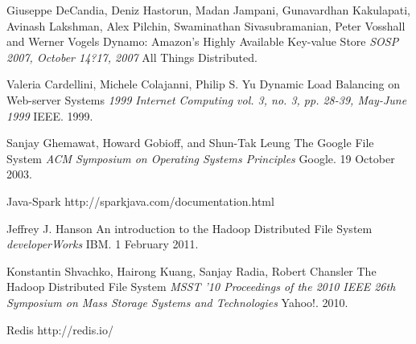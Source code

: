 \documentclass[twoside]{article}
\begin{document}
\begin{multicols}{2}
\begin{thebibliography}{99}
 Giuseppe DeCandia, Deniz Hastorun, Madan Jampani, Gunavardhan Kakulapati, Avinash Lakshman, Alex Pilchin, Swaminathan Sivasubramanian, Peter Vosshall and Werner Vogels
\newblock Dynamo: Amazon's Highly Available Key-value Store
\newblock \textit{SOSP 2007, October 14?17, 2007}
\newblock All Things Distributed.

 Valeria Cardellini, Michele Colajanni, Philip S. Yu
\newblock Dynamic Load Balancing on Web-server Systems
\newblock \textit{1999 Internet Computing vol. 3, no. 3, pp. 28-39, May-June 1999}
\newblock IEEE. 1999.

 Sanjay Ghemawat, Howard Gobioff, and Shun-Tak Leung
\newblock The Google File System
\newblock \textit{ACM Symposium on Operating Systems Principles}
\newblock Google. 19 October 2003.

 Java-Spark
\newblock http://sparkjava.com/documentation.html

 Jeffrey J. Hanson
\newblock An introduction to the Hadoop Distributed File System
\newblock \textit{developerWorks}
\newblock IBM. 1 February 2011.

 Konstantin Shvachko, Hairong Kuang, Sanjay Radia, Robert Chansler
\newblock The Hadoop Distributed File System
\newblock \textit{MSST '10 Proceedings of the 2010 IEEE 26th Symposium on Mass Storage Systems and Technologies}
\newblock Yahoo!. 2010.

 Redis
\newblock http://redis.io/

\end{thebibliography}



\end{multicols}
\end{document}
